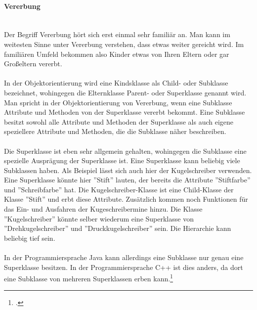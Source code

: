  \paragraph{Vererbung}\ \\
Der Begriff Vererbung hört sich erst einmal sehr familiär an. Man kann im weitesten Sinne unter Vererbung verstehen, dass etwas weiter gereicht wird. Im familiären Umfeld bekommen also Kinder etwas von Ihren Eltern oder gar Großeltern vererbt.\\
\\
In der Objektorientierung wird eine Kindsklasse als Child- oder Subklasse bezeichnet, wohingegen die Elternklasse Parent- oder Superklasse genannt wird. Man spricht in der Objektorientierung von Vererbung, wenn eine Subklasse Attribute und Methoden von der Superklasse vererbt bekommt. Eine Subklasse besitzt sowohl alle Attribute und Methoden der Superklasse als auch eigene speziellere Attribute und Methoden, die die Subklasse näher beschreiben.\\
\\
Die Superklasse ist eben sehr allgemein gehalten, wohingegen die Subklasse eine spezielle Ausprägung der Superklasse ist. Eine Superklasse kann beliebig viele Subklassen haben. Als Beispiel lässt sich auch hier der Kugelschreiber verwenden. Eine Superklasse könnte hier ''Stift'' lauten, der bereits die Attribute ''Stiftfarbe'' und ''Schreibfarbe'' hat. Die Kugelschreiber-Klasse ist eine Child-Klasse der Klasse ''Stift'' und erbt diese Attribute. Zusätzlich kommen noch Funktionen für das Ein- und Ausfahren der Kugeschreibermine hinzu. Die Klasse ''Kugelschreiber'' könnte selber wiederum eine Superklasse von ''Drehkugelschreiber'' und ''Druckkugelschreiber'' sein. Die Hierarchie kann beliebig tief sein.\\
\\
In der Programmiersprache Java kann allerdings eine Subklasse nur genau eine Superklasse besitzen. In der Programmiersprache C++ ist dies anders, da dort eine Subklasse von mehreren Superklassen erben kann.\footcite{shit_java_tut}

